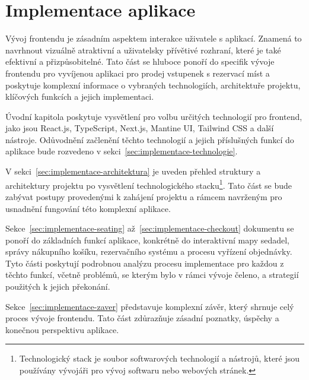 \chapter{Implementace aplikace}
\label{ch:implementace}
Vývoj frontendu je zásadním aspektem interakce uživatele s aplikací.
Znamená to navrhnout vizuálně atraktivní a uživatelsky přívětivé rozhraní, které je také efektivní a přizpůsobitelné.
Tato část se hluboce ponoří do specifik vývoje frontendu pro vyvíjenou aplikaci pro prodej vstupenek s rezervací míst a poskytuje komplexní informace o vybraných technologiích, architektuře projektu, klíčových funkcích a jejich implementaci.

Úvodní kapitola poskytuje vysvětlení pro volbu určitých technologií pro frontend, jako jsou React.js, TypeScript, Next.js, Mantine UI, Tailwind CSS a další nástroje.
Odůvodnění začlenění těchto technologií a jejich příslušných funkcí do aplikace bude rozvedeno v sekci~\ref{sec:implementace-technologie}.

V sekci~\ref{sec:implementace-architektura} je uveden přehled struktury a architektury projektu po vysvětlení technologického stacku\footnote{Technologický stack je soubor softwarových technologií a nástrojů, které jsou používány vývojáři pro vývoj softwaru nebo webových stránek.}.
Tato část se bude zabývat postupy provedenými k zahájení projektu a rámcem navrženým pro usnadnění fungování této komplexní aplikace.

Sekce~\ref{sec:implementace-seating} až~\ref{sec:implementace-checkout} dokumentu se ponoří do základních funkcí aplikace, konkrétně do interaktivní mapy sedadel, správy nákupního košíku, rezervačního systému a procesu vyřízení objednávky.
Tyto části poskytují podrobnou analýzu procesu implementace pro každou z těchto funkcí, včetně problémů, se kterým bylo v rámci vývoje čeleno, a strategií použitých k jejich překonání.

Sekce~\ref{sec:implementace-zaver} představuje komplexní závěr, který shrnuje celý proces vývoje frontendu.
Tato část zdůrazňuje zásadní poznatky, úspěchy a konečnou perspektivu aplikace.
